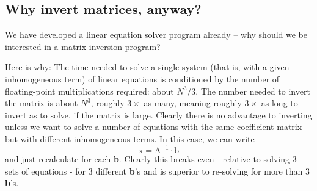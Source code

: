 \subsection{Why invert matrices, anyway?}

We have developed a linear equation solver program already
-- why should we be interested in a matrix inversion program?

Here is why: The time needed to solve a single system (that is,
with a given inhomogeneous term) of linear equations is conditioned by the number of floating-point multiplications required:
about $N^3/3$. The number needed to invert the matrix is about $N^3$,
roughly $3\times$ as many, meaning roughly $3\times$ as long to invert as to
solve, if the matrix is large. Clearly there is no advantage to
inverting unless we want to solve a number of equations with the
same coefficient matrix but with different inhomogeneous terms.
In this case, we can write
\begin{equation}
    \label{eq:09_39}
    \mathrm{x = A^{-1} \cdot b}
\end{equation} 
and just recalculate for each \textbf{b}. Clearly this breaks even - relative
to solving 3 sets of equations - for 3 different \textbf{b}'s and is superior
to re-solving for more than 3 \textbf{b}'s.

